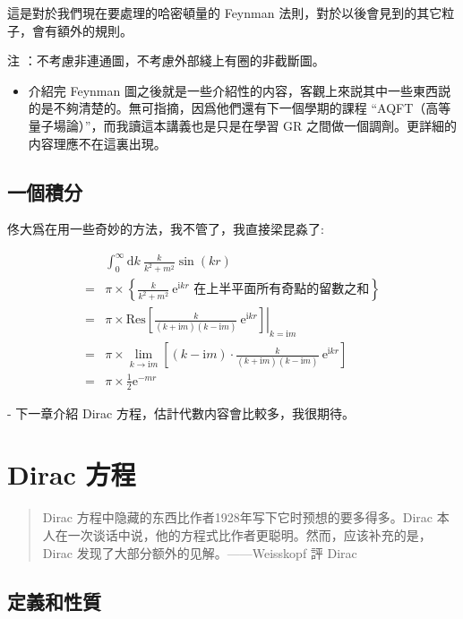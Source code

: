 \documentclass{article}
\begin{document}
這是對於我們現在要處理的哈密頓量的 Feynman 法則，對於以後會見到的其它粒子，會有額外的規則。

注 ：不考慮非連通圖，不考慮外部綫上有圈的非截斷圖。

\begin{itemize}
  \item 介紹完 Feynman 圖之後就是一些介紹性的内容，客觀上來説其中一些東西説的是不夠清楚的。無可指摘，因爲他們還有下一個學期的課程 “AQFT（高等量子場論）”，而我讀這本講義也是只是在學習 GR 之間做一個調劑。更詳細的内容理應不在這裏出現。
\end{itemize}

\subsection{一個積分}

佟大爲在用一些奇妙的方法，我不管了，我直接梁昆淼了:

$$
  \begin{aligned}
      & \int^{\infty}_0\mathrm{d}k\ \frac{k}{k^2+m^2}\sin(kr)                                                                               \\
    = & \pi\times\left\{\frac{k}{k^2+m^2}\ \mathrm{e}^{\mathrm{i}kr}\text{ 在上半平面所有奇點的留數之和}\right\}                                          \\
    = & \pi\times\mathrm{Res}\left.\left[\frac{k}{(k+\mathrm{i}m)(k-\mathrm{i}m)}\ \mathrm{e}^{\mathrm{i}kr}\right]\right|_{k=\mathrm{i}m}  \\
    = & \pi\times\lim_{k\to\mathrm{i}m}\left[(k-\mathrm{i}m)\cdot\frac{k}{(k+\mathrm{i}m)(k-\mathrm{i}m)}\ \mathrm{e}^{\mathrm{i}kr}\right] \\
    = & \pi\times\frac{1}{2}\mathrm{e}^{-mr}
  \end{aligned}
$$

- 下一章介紹 Dirac 方程，估計代數内容會比較多，我很期待。

\section{Dirac 方程}

\begin{quote}
  Dirac 方程中隐藏的东西比作者1928年写下它时预想的要多得多。Dirac 本人在一次谈话中说，他的方程式比作者更聪明。然而，应该补充的是，Dirac 发现了大部分额外的见解。——Weisskopf 評 Dirac
\end{quote}

\subsection{定義和性質}
\end{document}
